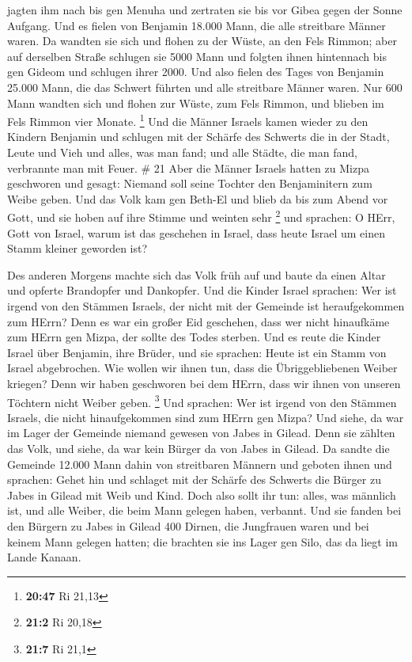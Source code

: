 jagten ihm nach bis gen Menuha und zertraten sie bis vor Gibea gegen der
Sonne Aufgang.  Und es fielen von Benjamin 18.000 Mann, die
alle streitbare Männer waren.  Da wandten sie sich und
flohen zu der Wüste, an den Fels Rimmon; aber auf derselben Straße
schlugen sie 5000 Mann und folgten ihnen hintennach bis gen Gideom und
schlugen ihrer 2000.  Und also fielen des Tages von
Benjamin 25.000 Mann, die das Schwert führten und alle streitbare Männer
waren.  Nur 600 Mann wandten sich und flohen zur Wüste, zum
Fels Rimmon, und blieben im Fels Rimmon vier Monate. \footnote{\textbf{20:47}
  Ri 21,13}  Und die Männer Israels kamen wieder zu den
Kindern Benjamin und schlugen mit der Schärfe des Schwerts die in der
Stadt, Leute und Vieh und alles, was man fand; und alle Städte, die man
fand, verbrannte man mit Feuer. \# 21  Aber die Männer
Israels hatten zu Mizpa geschworen und gesagt: Niemand soll seine
Tochter den Benjaminitern zum Weibe geben.  Und das Volk kam
gen Beth-El und blieb da bis zum Abend vor Gott, und sie hoben auf ihre
Stimme und weinten sehr \footnote{\textbf{21:2} Ri 20,18} 
und sprachen: O HErr, Gott von Israel, warum ist das geschehen in
Israel, dass heute Israel um einen Stamm kleiner geworden ist?

 Des anderen Morgens machte sich das Volk früh auf und baute
da einen Altar und opferte Brandopfer und Dankopfer.  Und
die Kinder Israel sprachen: Wer ist irgend von den Stämmen Israels, der
nicht mit der Gemeinde ist heraufgekommen zum HErrn? Denn es war ein
großer Eid geschehen, dass wer nicht hinaufkäme zum HErrn gen Mizpa, der
sollte des Todes sterben.  Und es reute die Kinder Israel
über Benjamin, ihre Brüder, und sie sprachen: Heute ist ein Stamm von
Israel abgebrochen.  Wie wollen wir ihnen tun, dass die
Übriggebliebenen Weiber kriegen? Denn wir haben geschworen bei dem
HErrn, dass wir ihnen von unseren Töchtern nicht Weiber geben.
\footnote{\textbf{21:7} Ri 21,1}  Und sprachen: Wer ist
irgend von den Stämmen Israels, die nicht hinaufgekommen sind zum HErrn
gen Mizpa? Und siehe, da war im Lager der Gemeinde niemand gewesen von
Jabes in Gilead.  Denn sie zählten das Volk, und siehe, da
war kein Bürger da von Jabes in Gilead.  Da sandte die
Gemeinde 12.000 Mann dahin von streitbaren Männern und geboten ihnen und
sprachen: Gehet hin und schlaget mit der Schärfe des Schwerts die Bürger
zu Jabes in Gilead mit Weib und Kind.  Doch also sollt ihr
tun: alles, was männlich ist, und alle Weiber, die beim Mann gelegen
haben, verbannt.  Und sie fanden bei den Bürgern zu Jabes
in Gilead 400 Dirnen, die Jungfrauen waren und bei keinem Mann gelegen
hatten; die brachten sie ins Lager gen Silo, das da liegt im Lande
Kanaan.

